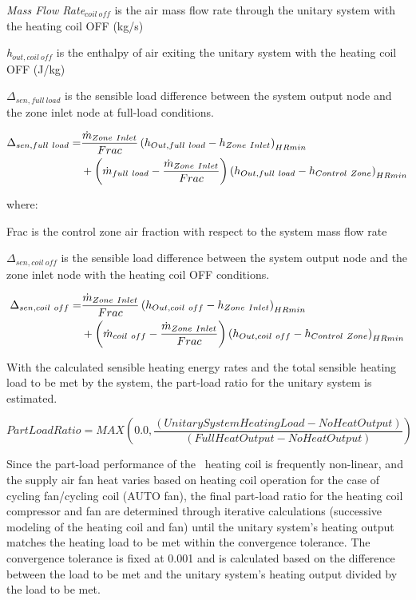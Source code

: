\emph{Mass Flow Rate\(_{coil~off}\)} is the air mass flow rate through the unitary system with the heating coil OFF (kg/s)

\emph{h\(_{out,coil~off}\)} is the enthalpy of air exiting the unitary system with the heating coil OFF (J/kg)

\(\Delta_{sen,full~load}\) is the sensible load difference between the system output node and the zone inlet node at full-load conditions.

\begin{equation}
  \begin{split}
    \Delta_{sen,full~load} =& \frac{\dot{m}_{Zone~Inlet}}{Frac} \left(h_{Out,full~load} - h_{Zone~Inlet}\right)_{HRmin} \\
                              &+ \left(\dot{m}_{full~load} - \frac{\dot{m}_{Zone~Inlet}}{Frac}\right) \left(h_{Out,full~load} - h_{Control~Zone}\right)_{HRmin}
  \end{split}
\end{equation}

where:

Frac is the control zone air fraction with respect to the system mass flow rate

\(\Delta_{sen,coil~off}\) is the sensible load difference between the system output node and the zone inlet node with the heating coil OFF conditions.

\begin{equation}
  \begin{split}
    \Delta_{sen,coil~off} =& \frac{\dot{m}_{Zone~Inlet}}{Frac} \left(h_{Out,coil~off} - h_{Zone~Inlet}\right)_{HRmin} \\
                              &+ \left(\dot{m}_{coil~off} - \frac{\dot{m}_{Zone~Inlet}}{Frac}\right) \left(h_{Out,coil~off} - h_{Control~Zone}\right)_{HRmin}
  \end{split}
\end{equation}

With the calculated sensible heating energy rates and the total sensible heating load to be met by the system, the part-load ratio for the unitary system is estimated.

\begin{equation}
PartLoadRatio = MAX\left( {0.0,\frac{{\left( {UnitarySystemHeatingLoad - NoHeatOutput} \right)}}{{\left( {FullHeatOutput - NoHeatOutput} \right)}}} \right)
\end{equation}

Since the part-load performance of the~ heating coil is frequently non-linear, and the supply air fan heat varies based on heating coil operation for the case of cycling fan/cycling coil (AUTO fan), the final part-load ratio for the heating coil compressor and fan are determined through iterative calculations (successive modeling of the heating coil and fan) until the unitary system's heating output matches the heating load to be met within the convergence tolerance. The convergence tolerance is fixed at 0.001 and is calculated based on the difference between the load to be met and the unitary system's heating output divided by the load to be met.

